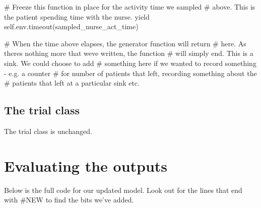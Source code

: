 \documentclass[
  letterpaper,
  DIV=11,
  numbers=noendperiod]{scrreprt}
\newenvironment{Shaded}{}{}
\newcommand{\CommentTok}[1]{\textcolor[rgb]{0.42,0.45,0.49}{#1}}
\newcommand{\ControlFlowTok}[1]{\textcolor[rgb]{0.84,0.23,0.29}{#1}}
\newcommand{\NormalTok}[1]{\textcolor[rgb]{0.14,0.16,0.18}{#1}}
\newcommand{\VariableTok}[1]{\textcolor[rgb]{0.89,0.38,0.04}{#1}}
\begin{document}
\begin{Shaded}
\begin{Highlighting}[]
            \CommentTok{\# Freeze this function in place for the activity time we sampled}
            \CommentTok{\# above.  This is the patient spending time with the nurse.}
            \ControlFlowTok{yield} \VariableTok{self}\NormalTok{.env.timeout(sampled\_nurse\_act\_time)}

            \CommentTok{\# When the time above elapses, the generator function will return}
            \CommentTok{\# here.  As there\textquotesingle{}s nothing more that we\textquotesingle{}ve written, the function}
            \CommentTok{\# will simply end.  This is a sink.  We could choose to add}
            \CommentTok{\# something here if we wanted to record something {-} e.g. a counter}
            \CommentTok{\# for number of patients that left, recording something about the}
            \CommentTok{\# patients that left at a particular sink etc.}
\end{Highlighting}
\end{Shaded}

\subsection{The trial class}\label{the-trial-class}

The trial class is unchanged.

\section{Evaluating the outputs}\label{evaluating-the-outputs}

Below is the full code for our updated model. Look out for the lines
that end with \#NEW to find the bits we've added.
\end{document}
